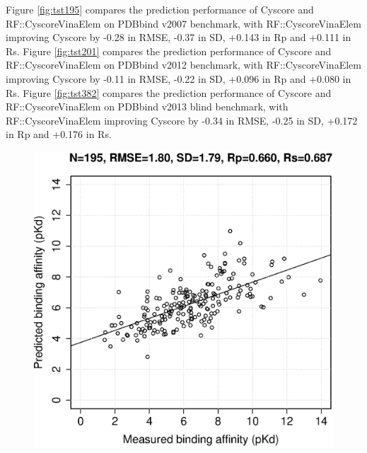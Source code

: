 \documentclass[journal=jacsat,manuscript=article]{achemso}
\begin{document}
Figure \ref{fig:tst195} compares the prediction performance of Cyscore and RF::CyscoreVinaElem on PDBbind v2007 benchmark, with RF::CyscoreVinaElem improving Cyscore by -0.28 in RMSE, -0.37 in SD, +0.143 in Rp and +0.111 in Rs. Figure \ref{fig:tst201} compares the prediction performance of Cyscore and RF::CyscoreVinaElem on PDBbind v2012 benchmark, with RF::CyscoreVinaElem improving Cyscore by -0.11 in RMSE, -0.22 in SD, +0.096 in Rp and +0.080 in Rs. Figure \ref{fig:tst382} compares the prediction performance of Cyscore and RF::CyscoreVinaElem on PDBbind v2013 blind benchmark, with RF::CyscoreVinaElem improving Cyscore by -0.34 in RMSE, -0.25 in SD, +0.172 in Rp and +0.176 in Rs.

\begin{figure}[ht!]
\includegraphics[width=\linewidth]{../rfcyscore/x4/mlr/trn-247-tst-195-yp.eps}
\endminipage
{}

\end{figure}
\end{document}

